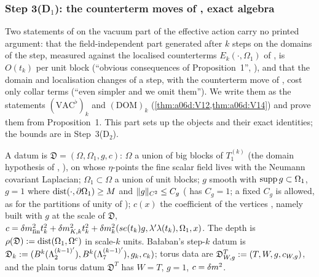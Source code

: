 
\subsubsection*{Step 3(D$_1$): the counterterm moves of \cite[pp.~411--422]{Ba3}, exact algebra}

Two statements of \cite{Ba3} on the vacuum part of the effective action carry no printed argument: that the field-independent part generated after $k$ steps on the domains of the step, measured against the localised counterterms $E_k(\cdot,\Omega_1)$ of \cite[(1.30)]{Ba3}, is $O(t_k)$ per unit block (``obvious consequences of Proposition~1'', \cite[pp.~421--422]{Ba3}), and that the domain and localisation changes of a step, with the counterterm move of \cite[p.~422]{Ba3}, cost only collar terms (``even simpler and we omit them''). We write them as the statements $(\mathrm{VAC}^\flat)_k$ and $(\mathrm{DOM})_k$ (\cref{thm:a06d:V12,thm:a06d:V14}) and prove them from Proposition~1. This part sets up the objects and their exact identities; the bounds are in Step~3(D$_2$).

\begin{definition}\label{def:a06d:V1}
A datum is $\mathfrak D=(\Omega,\Omega_1,g,c)$: $\Omega$ a union of big blocks of $T^{(k)}_1$ (the domain hypothesis of \cite[Props.~2.1--2.3]{Ba1}, \cite[p.~411]{Ba3}), on whose $\eta$-points the fine scalar field lives with the Neumann covariant Laplacian; $\Omega_1\subset\Omega$ a union of unit blocks; $g$ smooth with $\operatorname{supp} g\subset\Omega_1$, $g=1$ where $\operatorname{dist}(\cdot,\partial\Omega_1)\ge M$ and $\lVert g\rVert_{C^2}\le C_g$ (\cite[p.~412]{Ba3} has $C_g=1$; a fixed $C_g$ is allowed, as for the partitions of unity of \cite[p.~420]{Ba3}); $c(x)$ the coefficient of the vertices \cite[(1.7)]{Ba3}, namely \cite[(1.29)]{Ba3} built with $g$ at the scale of $\mathfrak D$, $c=\delta m^2_{\mathrm{fin}}t_k^2+\delta m^2_{K,k}t_k^2+\delta m^2_k(se(t_k)g,\lambda'\lambda(t_k),\Omega_1,x)$. The depth is $\rho(\mathfrak D):=\operatorname{dist}(\Omega_1,\Omega^c)$ in scale-$k$ units. Ba{\l}aban's step-$k$ datum is $\mathfrak D_k:=(B^k(\Lambda^{(k-1)'}_2),B^k(\Lambda^{(k-1)'}_7),g_k,c_k)$; torus data are $\mathfrak D^T_{W,g}:=(T,W,g,c_{W,g})$, and the plain torus datum $\mathfrak D^T$ has $W=T$, $g=1$, $c=\delta m^2$.
\end{definition}


